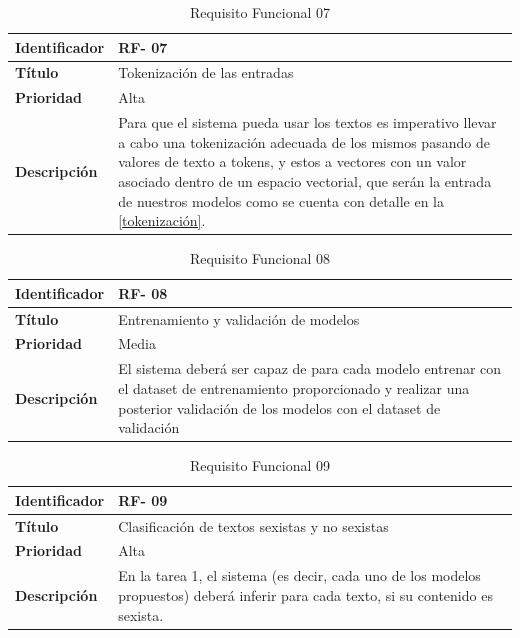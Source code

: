 \begin{table}[H] 
\begin{center}
\begin{tabular} {|P{4cm}|P{10cm}|}\hline
   {\bf Identificador} &{\bf RF- 07}\\ \hline
  \textbf{Título}& Tokenización de las entradas\\ \hline
  \textbf{Prioridad}& Alta  \\ \hline
  \textbf{Descripción}& Para que el sistema pueda usar los textos es imperativo llevar a cabo una tokenización adecuada de los mismos pasando de valores de texto a tokens, y estos a vectores con un valor asociado dentro de un espacio vectorial, que serán la entrada de nuestros modelos como se cuenta con detalle en la \autoref{tokenización}.\\ \hline
\end{tabular}
\end{center}
\vspace{-0.6cm}
\caption{Requisito Funcional 07}
\end{table}

\begin{table}[H] 
\begin{center}
\begin{tabular} {|P{4cm}|P{10cm}|}\hline
   {\bf Identificador} &{\bf RF- 08}\\ \hline
  \textbf{Título}& Entrenamiento y validación de modelos\\ \hline
  \textbf{Prioridad}& Media\\ \hline
  \textbf{Descripción}&  El sistema deberá ser capaz de para cada modelo entrenar con el dataset de entrenamiento proporcionado y realizar una posterior validación de los modelos con el dataset de validación\\ \hline
\end{tabular}
\end{center}
\vspace{-0.6cm}
\caption{Requisito Funcional 08}
\end{table}

\begin{table}[H] 
\begin{center}
\begin{tabular} {|P{4cm}|P{10cm}|}\hline
   {\bf Identificador} &{\bf RF- 09}\\ \hline
  \textbf{Título}& Clasificación de textos sexistas y no sexistas\\ \hline
  \textbf{Prioridad}& Alta  \\ \hline
  \textbf{Descripción}& En la tarea 1, el sistema (es decir, cada uno de los modelos propuestos) deberá inferir para cada texto, si su contenido es sexista.\\ \hline
\end{tabular}
\end{center}
\vspace{-0.6cm}
\caption{Requisito Funcional 09}
\end{table}

